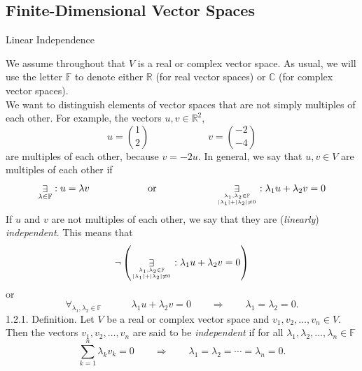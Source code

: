 \documentclass[smaller,hyperref={CJKbookmarks=true}]{beamer}
\newcommand{\C}{\mathbb{C}} \newcommand{\F}{\mathbb{F}} \newcommand{\R}{\mathbb{R}} \newcommand{\Q}{\mathbb{Q}}
\newcommand{\myseries}[2]{$#1_1,#1_2,\dots,#1_#2$}
\begin{document}
\subsection{Finite-Dimensional Vector Spaces}
\begin{frame}[c]
\begin{spacing}{2.5}
\tableofcontents[sectionstyle=hide,subsectionstyle=show/shaded/hide] \end{spacing}
\end{frame}
\begin{frame}{Linear Independence} \begin{spacing}{0.9}
We assume throughout that $V$ is a real or complex vector space. As usual, we will use the letter $\F$ to denote either $\R$ (for real vector spaces) or $\C$ (for complex vector spaces).\\
We want to distinguish elements of vector spaces that are not simply
multiples of each other. For example, the vectors $u,v\in\R^2$,
\[u=\binom{1}{2}\qquad\qquad\qquad v=\binom{-2}{-4}\]
are multiples of each other, because $v=-2u.$ In general, we say that $u,v\in V$ are multiples of each other if
\begin{equation*}
  \mathop{\exists}_{\lambda\in\F}:u=\lambda v
  \qquad\qquad\qquad\text{or}\qquad\qquad\qquad
  \mathop{\exists}_{\lambda_1,\lambda_2\in\F\atop \vert\lambda_1\vert+\vert\lambda_2\vert\neq0}:\lambda_1u+\lambda_2v=0
\end{equation*}
\newpage
If $u$ and $v$ are not multiples of each other, we say that they are (\emph{linearly})\\ \emph{independent}. This means that
\[\neg\left(\mathop{\exists}_{\lambda_1,\lambda_2\in\F\atop\vert\lambda_1\vert+\vert\lambda_2\vert\neq0}:\lambda_1u+\lambda_2v=0\right)\]
or
\begin{equation*}
  \mathop{\forall}_{\lambda_1,\lambda_2\in\F}\qquad\quad\lambda_1u+\lambda_2v=0\quad\quad\Rightarrow\quad\quad\lambda_1=\lambda_2=0.
\end{equation*}
\alert{1.2.1. Definition.} Let $V$ be a real or complex vector space and \myseries{v}{n}$\in V$. Then the vectors \myseries{v}{n} are said to be \emph{independent} if for all \myseries{\lambda}{n}$\in\F$ \vspace*{-4mm}
\[\sum_{k=1}^{n}\lambda_kv_k=0\qquad\Rightarrow\qquad\lambda_1=\lambda_2=\cdots=\lambda_n=0.\]


\end{spacing}
\end{frame}
\end{document}
